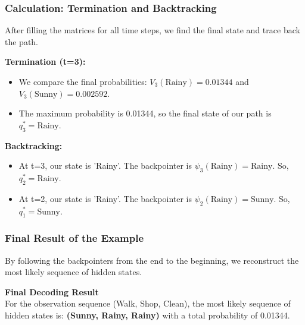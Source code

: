 \documentclass[aspectratio=43, 9pt]{beamer}
\begin{document}
\begin{frame}
    \frametitle{Calculation: Termination and Backtracking}
    After filling the matrices for all time steps, we find the final state and trace back the path.
    
    \vspace{1em}
    
    \textbf{Termination (t=3):}
    \begin{itemize}
        \item We compare the final probabilities: $V_3(\text{Rainy}) = 0.01344$ and $V_3(\text{Sunny}) = 0.002592$.
        \item The maximum probability is 0.01344, so the final state of our path is $q_3^* = \text{Rainy}$.
    \end{itemize}
    
    \textbf{Backtracking:}
    \begin{itemize}
        \item At t=3, our state is 'Rainy'. The backpointer is $\psi_3(\text{Rainy}) = \text{Rainy}$. So, $q_2^* = \text{Rainy}$.
        \item At t=2, our state is 'Rainy'. The backpointer is $\psi_2(\text{Rainy}) = \text{Sunny}$. So, $q_1^* = \text{Sunny}$.
    \end{itemize}
\end{frame}

\begin{frame}
    \frametitle{Final Result of the Example}
    By following the backpointers from the end to the beginning, we reconstruct the most likely sequence of hidden states.
    
    \vspace{1em}
    
    \begin{Takeaway}
        \textbf{Final Decoding Result} \\
        For the observation sequence (Walk, Shop, Clean), the most likely sequence of hidden states is:
        \textbf{(Sunny, Rainy, Rainy)}
        with a total probability of 0.01344.
    \end{Takeaway}
\end{frame}
\end{document}

